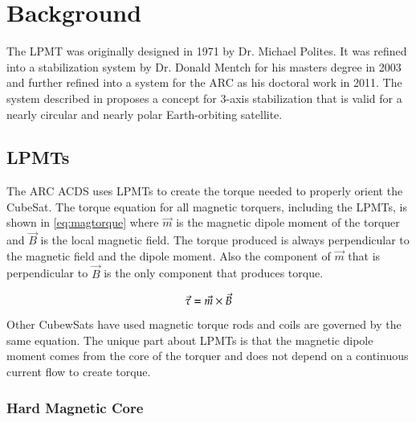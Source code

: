 

\chapter{Background}

\label{ch:BG}


The \ac{LPMT} was originally designed in 1971 by Dr. Michael Polites\cite{Polites71}. It was refined into a stabilization system by Dr. Donald Mentch for his masters degree in 2003 and further refined into a system for the \ac{ARC} as his doctoral work in 2011\cite{Mentch11}. The system described in \cite{Mentch11} proposes a concept for 3-axis stabilization that is valid for a nearly circular and nearly polar Earth-orbiting satellite.

\section{\aclp{LPMT}}

The \ac{ARC} \ac{ACDS} uses \acfp{LPMT} to create the torque needed to properly orient the CubeSat. The torque equation for all magnetic torquers, including the \acp{LPMT}, is shown in \cref{eq:magtorque} where $\vec{m}$ is the magnetic dipole moment of the torquer and $\vec{B}$ is the local magnetic field. The torque produced is always perpendicular to the magnetic field and the dipole moment. Also the component of $\vec{m}$ that is perpendicular to $\vec{B}$ is the only component that produces torque.

\begin{equation}
    \vec{\tau} = \vec{m} \times \vec{B}
    \label{eq:magtorque}
\end{equation}

Other CubewSats have used magnetic torque rods and coils are governed by the same equation. The unique part about \acp{LPMT} is that the magnetic dipole moment comes from the core of the torquer and does not depend on a continuous current flow to create torque.


\subsection{Hard Magnetic Core}

